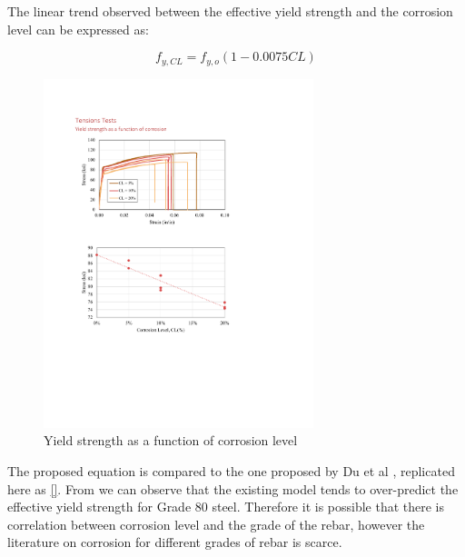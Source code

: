 The linear trend observed between the effective yield strength and the corrosion level can be expressed as:

\begin{equation}
    f_{y,CL} = f_{y,o}(1-0.0075CL)
    \label{eq.Calderon_Fy_vs_CL}
\end{equation}

\begin{figure}[htbp]
	\centering
	\includegraphics[width=0.7\textwidth]{VAC Thesis 2.0/Chapter-4/figs/TensionTest_results_2.pdf}
	\caption{Yield strength as a function of corrosion level}
	\label{fig:YieldStrength_vs_CL}
\end{figure}

The proposed equation is compared to the one proposed by Du et al \cite{Du2005}, replicated here as \ref{}. From  we can observe that the existing model tends to over-predict the effective yield strength for Grade 80 steel. Therefore it is possible that there is correlation between corrosion level and the grade of the rebar, however the literature on corrosion for different grades of rebar is scarce. 

